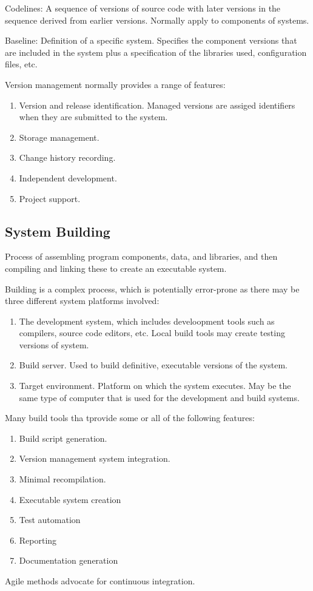 \documentclass{article}
\begin{document}
Codelines: A sequence of versions of source code with later versions in the sequence derived from earlier versions.  Normally apply to components of systems.

Baseline:  Definition of a specific system.  Specifies the component versions that are included in the system plus a specification of the libraries used, configuration files, etc.

Version management normally provides a range of features:
\begin{enumerate}
\item Version and release identification.  Managed versions are assiged identifiers when they are submitted to the system.
\item Storage management.
\item Change history recording.
\item Independent development.
\item Project support.
\end{enumerate}

\subsection{System Building}
Process of assembling program components, data, and libraries, and then compiling and linking these to create an executable system.

Building is a complex process, which is potentially error-prone as there may be three different system platforms involved:
\begin{enumerate}
\item The development system, which includes develoopment tools such as compilers, source code editors, etc.  Local build tools may create testing versions of system.
\item Build server.  Used to build definitive, executable versions of the system.  
\item Target environment.  Platform on which the system executes.  May be the same type of computer that is used for the development and build systems.
\end{enumerate}
 Many build tools tha tprovide some or all of the following features:
\begin{enumerate}
\item Build script generation.
\item Version management system integration.
\item Minimal recompilation.
\item Executable system creation
\item Test automation
\item Reporting
\item Documentation generation
\end{enumerate}
Agile methods advocate for continuous integration.
\end{document}
